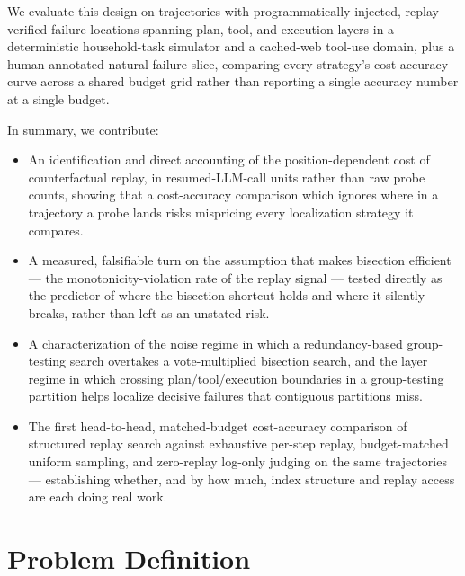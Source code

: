 \documentclass[11pt]{article}
\begin{document}
We evaluate this design on trajectories with programmatically injected, replay-verified failure locations spanning plan, tool, and execution layers in a deterministic household-task simulator and a cached-web tool-use domain, plus a human-annotated natural-failure slice, comparing every strategy's cost-accuracy curve across a shared budget grid rather than reporting a single accuracy number at a single budget.

In summary, we contribute:
\begin{itemize}[leftmargin=1.4em]
\item An identification and direct accounting of the position-dependent cost of counterfactual replay, in resumed-LLM-call units rather than raw probe counts, showing that a cost-accuracy comparison which ignores where in a trajectory a probe lands risks mispricing every localization strategy it compares.
\item A measured, falsifiable turn on the assumption that makes bisection efficient --- the monotonicity-violation rate of the replay signal --- tested directly as the predictor of where the bisection shortcut holds and where it silently breaks, rather than left as an unstated risk.
\item A characterization of the noise regime in which a redundancy-based group-testing search overtakes a vote-multiplied bisection search, and the layer regime in which crossing plan/tool/execution boundaries in a group-testing partition helps localize decisive failures that contiguous partitions miss.
\item The first head-to-head, matched-budget cost-accuracy comparison of structured replay search against exhaustive per-step replay, budget-matched uniform sampling, and zero-replay log-only judging on the same trajectories --- establishing whether, and by how much, index structure and replay access are each doing real work.
\end{itemize}

\section{Problem Definition}
\end{document}
